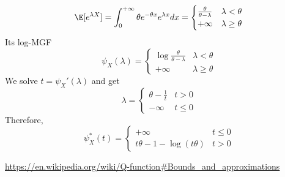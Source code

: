 \documentclass{article}
\begin{document}
\begin{enumerate}
\begin{enumerate}
    \begin{equation*}
    \E[e^{\lambda X}] = \int_0^{+\infty}
    \theta e^{-\theta x}e^{\lambda x}dx
    =
    \begin{cases}
    \frac{\theta}{\theta - \lambda} & \lambda < \theta \\
    +\infty & \lambda \geq \theta
    \end{cases}
    \end{equation*}
Its log-MGF 
 \begin{equation*}
 \psi_X(\lambda)=
 \begin{cases}
 \log\frac{\theta}{\theta - \lambda} & \lambda < \theta \\
    +\infty & \lambda \geq \theta
  \end{cases}
 \end{equation*}
     We solve
    $t=\psi_X'(\lambda)$ and get
    \begin{equation*}
    \lambda = \begin{cases}\theta - \frac{1}{t} & t > 0
    \\
    -\infty & t \leq 0
    \end{cases}
 \end{equation*} Therefore,
    \begin{equation*}
 \psi^*_X(t)=
 \begin{cases}
+\infty & t \leq 0 \\
    t\theta - 1 -\log(t\theta) & t >0
  \end{cases}
 \end{equation*}
    
\end{enumerate}

\end{enumerate}
\begin{thebibliography}{9}
 \url{https://en.wikipedia.org/wiki/Q-function#Bounds_and_approximations}
\end{thebibliography}
\end{document}
